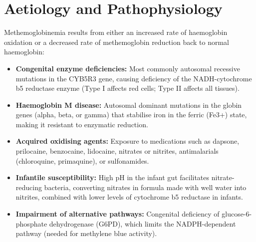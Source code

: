 \section*{Aetiology and Pathophysiology}
Methemoglobinemia results from either an increased rate of haemoglobin oxidation or a decreased rate of methemoglobin reduction back to normal haemoglobin:
\begin{itemize}
    \item \textbf{Congenital enzyme deficiencies:} Most commonly autosomal recessive mutations in the CYB5R3 gene, causing deficiency of the NADH-cytochrome b5 reductase enzyme (Type I affects red cells; Type II affects all tissues).
    \item \textbf{Haemoglobin M disease:} Autosomal dominant mutations in the globin genes (alpha, beta, or gamma) that stabilise iron in the ferric (Fe3+) state, making it resistant to enzymatic reduction.
    \item \textbf{Acquired oxidising agents:} Exposure to medications such as dapsone, prilocaine, benzocaine, lidocaine, nitrates or nitrites, antimalarials (chloroquine, primaquine), or sulfonamides.
    \item \textbf{Infantile susceptibility:} High pH in the infant gut facilitates nitrate-reducing bacteria, converting nitrates in formula made with well water into nitrites, combined with lower levels of cytochrome b5 reductase in infants.
    \item \textbf{Impairment of alternative pathways:} Congenital deficiency of glucose-6-phosphate dehydrogenase (G6PD), which limits the NADPH-dependent pathway (needed for methylene blue activity).
\end{itemize}

